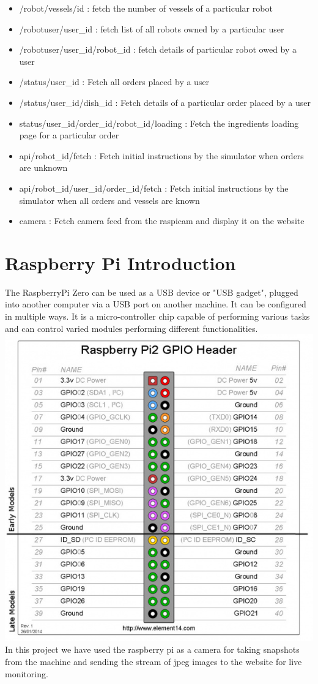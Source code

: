 {\begin{itemize}
    \item /robot/vessels/{id} : fetch the number of vessels of a particular robot
    \item /robotuser/{user\_id} : fetch list of all robots owned by a particular user 
    \item /robotuser/{user\_id}/{robot\_id} : fetch details of particular robot owed by a user
    \item /status/{user\_id} : Fetch all orders placed by a user
    \item /status/{user\_id}/{dish\_id} : Fetch details of a particular order placed by a user 
    \item status/user\_id/order\_id/robot\_id/loading : Fetch the ingredients loading page for a particular order
    \item api/robot\_id/fetch : Fetch initial instructions by the simulator when orders are unknown 
    \item api/robot\_id/user\_id/order\_id/fetch : Fetch initial instructions by the simulator when all orders and vessels are known 
    \item camera : Fetch camera feed from the raspicam and display it on the website
\end{itemize}
}
\section{Raspberry Pi Introduction}
{\normalsize The RaspberryPi Zero can be used as a USB device or "USB gadget", plugged into another computer via a USB port on another machine. It can be configured in multiple ways. It is a micro-controller chip capable of performing various tasks and can control varied modules performing different functionalities.\\[0.1in]
\includegraphics[width=1.0\textwidth]{header_pinout.jpg}\\[0.1in]
In this project we have used the raspberry pi as a camera for taking snapshots from the machine and sending the stream of jpeg images to the website for live monitoring.  
}\\
